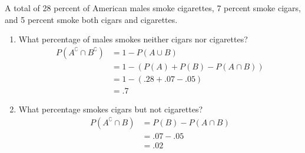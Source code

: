 \item A total of 28 percent of American males smoke cigarettes, 7 percent smoke cigars, and 5 percent smoke both cigars and cigarettes.
\begin{enumerate}
    \item What percentage of males smokes neither cigars nor cigarettes?
    \begin{align*}
        P(A^\complement  \cap B^\complement )
        &= 1 - P(A \cup B)\\
        &= 1 - (P(A) + P(B) - P(A \cap B))\\
        &= 1 - (.28 + .07 - .05)\\
        &= .7
    \end{align*}
    \item What percentage smokes cigars but not cigarettes?
    \begin{align*}
        P(A^\complement  \cap B)
        &= P(B) - P(A \cap B)\\
        &= .07 - .05\\
        &= .02
    \end{align*}
\end{enumerate}